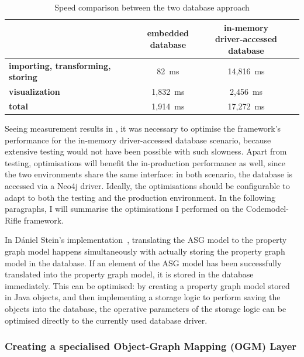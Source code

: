 \begin{table}[!htb]
	\centering
	\begin{tabular}{l|cc}
		\toprule
																								& \shortstack{\textbf{embedded} \\ \textbf{database}}
																								& \shortstack{\textbf{in-memory} \\ \textbf{driver-accessed database}}
																								\\
		\midrule
		\textbf{importing, transforming, storing}   &   82~ms      &   14,816~ms   \\
		\textbf{visualization}                      &   1,832~ms   &   2,456~ms    \\
		\midrule
		\textbf{total}                              &   1,914~ms   &   17,272~ms   \\
		\bottomrule
	\end{tabular}

	\caption{Speed comparison between the two database approach}
	\label{table:embedded-vs-in-memory-remote-table}
\end{table}

Seeing measurement results in , it was necessary to optimise the framework's performance for the in-memory driver-accessed database scenario, because extensive testing would not have been possible with such slowness. Apart from testing, optimisations will benefit the in-production performance as well, since the two environments share the same interface: in both scenario, the database is accessed via a Neo4j driver. Ideally, the optimisations should be configurable to adapt to both the testing and the production environment. In the following paragraphs, I will summarise the optimisations I performed on the Codemodel-Rifle framework.

In Dániel Stein's implementation~\cite{stein-daniel-msc}, translating the ASG model to the property graph model happens simultaneously with actually storing the property graph model in the database. If an element of the ASG model has been successfully translated into the property graph model, it is stored in the database immediately. This can be optimised: by creating a property graph model stored in Java objects, and then implementing a storage logic to perform saving the objects into the database, the operative parameters of the storage logic can be optimised directly to the currently used database driver.

\subsubsection{Creating a specialised Object-Graph Mapping (OGM) Layer}

